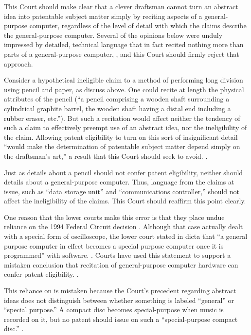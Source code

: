 \documentclass{scotus}
\begin{document}
This Court should make clear that a clever draftsman cannot turn an abstract
idea into patentable subject matter simply by reciting
aspects of a general-purpose computer, regardless of the level of detail with
which the claims describe the general-purpose computer. Several of the opinions
below were unduly impressed by detailed, technical language that in fact recited
nothing more than parts of a general-purpose computer, , and this Court should firmly reject that approach.

Consider a hypothetical ineligible claim to a method of performing long
division using pencil and paper, as \amici discuss above. One could
recite at length the physical attributes of the pencil (``a pencil
comprising a wooden shaft surrounding a cylindrical graphite barrel, the wooden
shaft having a distal end including a rubber eraser, etc.''). But such a
recitation would affect neither the tendency of such a claim to effectively
preempt use of an abstract idea, nor the ineligibility of the claim. Allowing
patent eligibility to turn on this sort of insignificant detail ``would make the
determination of patentable subject matter depend simply on the draftsman's
art,'' a result that this Court should seek to avoid. .

Just as details about a pencil should not confer patent
eligibility, neither should details about a general-purpose
computer.
Thus, language from the claims at issue, such as
``data storage unit'' and ``communications controller,'' should not affect the
ineligibility of the claims. This Court should reaffirm this point clearly.

One reason that the lower courts make this error is that they place undue
reliance on the 1994 Federal Circuit decision . Although that
case actually dealt with a special form of oscilloscope,
the lower court stated in dicta
that ``a general purpose computer in effect becomes a special purpose computer
once it is programmed'' with software. .
Courts have used this statement to support a mistaken conclusion that recitation
of general-purpose computer hardware can confer patent eligibility.
.

This reliance on  is mistaken because the
Court's precedent regarding abstract ideas does not
distinguish between whether something is labeled ``general'' or
``special purpose.'' A
compact disc becomes special-purpose when music is recorded on it, but no patent
should issue on such a ``special-purpose compact disc.'' .
\end{document}

